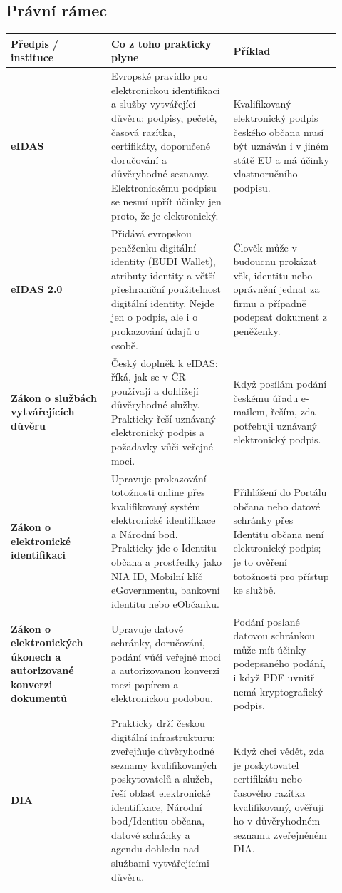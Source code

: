 \documentclass[11pt,a4paper]{article}
\begin{document}
\subsection*{Právní rámec}
\begin{longtable}{p{0.28\linewidth}p{0.34\linewidth}p{0.30\linewidth}}
\toprule
\textbf{Předpis / instituce} & \textbf{Co z toho prakticky plyne} & \textbf{Příklad}\\
\midrule
\textbf{eIDAS} & Evropské pravidlo pro elektronickou identifikaci a služby vytvářející důvěru: podpisy, pečetě, časová razítka, certifikáty, doporučené doručování a důvěryhodné seznamy. Elektronickému podpisu se nesmí upřít účinky jen proto, že je elektronický. & Kvalifikovaný elektronický podpis českého občana musí být uznáván i v jiném státě EU a má účinky vlastnoručního podpisu.\\
\addlinespace
\textbf{eIDAS 2.0} & Přidává evropskou peněženku digitální identity (EUDI Wallet), atributy identity a větší přeshraniční použitelnost digitální identity. Nejde jen o podpis, ale i o prokazování údajů o osobě. & Člověk může v budoucnu prokázat věk, identitu nebo oprávnění jednat za firmu a případně podepsat dokument z peněženky.\\
\addlinespace
\textbf{Zákon o službách vytvářejících důvěru} & Český doplněk k eIDAS: říká, jak se v ČR používají a dohlížejí důvěryhodné služby. Prakticky řeší uznávaný elektronický podpis a požadavky vůči veřejné moci. & Když posílám podání českému úřadu e-mailem, řeším, zda potřebuji uznávaný elektronický podpis.\\
\addlinespace
\textbf{Zákon o elektronické identifikaci} & Upravuje prokazování totožnosti online přes kvalifikovaný systém elektronické identifikace a Národní bod. Prakticky jde o Identitu občana a prostředky jako NIA ID, Mobilní klíč eGovernmentu, bankovní identitu nebo eObčanku. & Přihlášení do Portálu občana nebo datové schránky přes Identitu občana není elektronický podpis; je to ověření totožnosti pro přístup ke službě.\\
\addlinespace
\textbf{Zákon o elektronických úkonech a autorizované konverzi dokumentů} & Upravuje datové schránky, doručování, podání vůči veřejné moci a autorizovanou konverzi mezi papírem a elektronickou podobou. & Podání poslané datovou schránkou může mít účinky podepsaného podání, i když PDF uvnitř nemá kryptografický podpis.\\
\addlinespace
\textbf{DIA} & Prakticky drží českou digitální infrastrukturu: zveřejňuje důvěryhodné seznamy kvalifikovaných poskytovatelů a služeb, řeší oblast elektronické identifikace, Národní bod/Identitu občana, datové schránky a agendu dohledu nad službami vytvářejícími důvěru. & Když chci vědět, zda je poskytovatel certifikátu nebo časového razítka kvalifikovaný, ověřuji ho v důvěryhodném seznamu zveřejněném DIA.\\
\bottomrule
\end{longtable}
\end{document}
